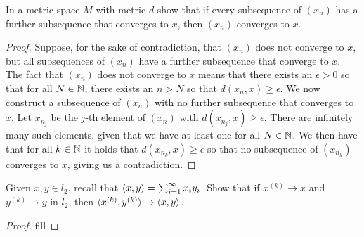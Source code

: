 \begin{exercise}{39}
In a metric space $M$ with metric $d$ show that if every subsequence of $(x_n)$ has a further subsequence that converges to $x$, then $(x_n)$ converges to $x$.
\end{exercise}
\begin{proof}
Suppose, for the sake of contradiction, that $(x_n)$ does not converge to $x$, but all subsequences of $(x_n)$ have a further subsequence that converge to $x$. The fact that $(x_n)$ does not converge to $x$ means that there exists an $\epsilon>0$ so that for all $N\in\mathbb{N}$, there exists an $n>N$ so that $d(x_n,x)\geq\epsilon$. We now construct a subsequence of $(x_n)$ with no further subsequence that converges to $x$. Let $x_{n_j}$ be the $j$-th element of $(x_n)$ with $d(x_{n_j},x)\geq\epsilon$. There are infinitely many such elements, given that we have at least one for all $N\in\mathbb{N}$. We then have that for all $k\in\mathbb{N}$ it holds that $d(x_{n_k},x)\geq\epsilon$ so that no subsequence of $(x_{n_k})$ converges to $x$, giving us a contradiction.
\end{proof} 

\begin{exercise}{41}
Given $x,y\in l_2$, recall that $\langle x,y\rangle=\sum_{i=1}^\infty x_iy_i$. Show that if $x^{(k)}\to x$ and $y^{(k)}\to y$ in $l_2$, then $\langle x^{(k)},y^{(k)}\rangle\to\langle x,y\rangle$.
\end{exercise}
\begin{proof}
fill
\end{proof} 

